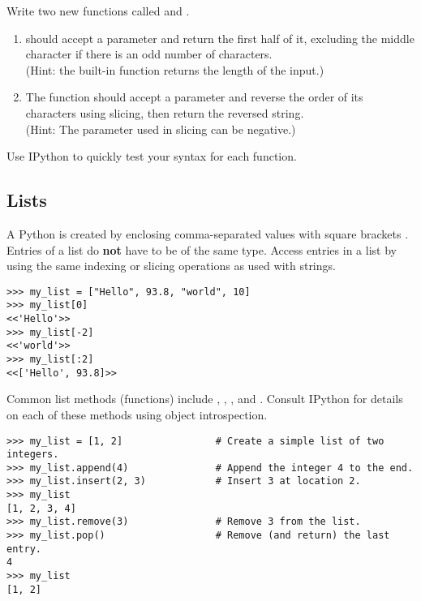 \begin{problem} %
Write two new functions called  and .
\begin{enumerate}
\item {} should accept a parameter and return the first half of it, excluding the middle character if there is an odd number of characters.
\\
(Hint: the built-in function  returns the length of the input.)
\item The  function should accept a parameter and reverse the order of its characters using slicing, then return the reversed string.
\\
(Hint: The  parameter used in slicing can be negative.)
\end{enumerate}
Use IPython to quickly test your syntax for each function.
\end{problem}

\subsection*{Lists} %

A Python  is created by enclosing comma-separated values with square brackets \li{[ ]}.
Entries of a list do \textbf{not} have to be of the same type.
Access entries in a list by using the same indexing or slicing operations as used with strings.

\begin{lstlisting}
>>> my_list = ["Hello", 93.8, "world", 10]
>>> my_list[0]
<<'Hello'>>
>>> my_list[-2]
<<'world'>>
>>> my_list[:2]
<<['Hello', 93.8]>>
\end{lstlisting}

Common list methods (functions) include , , , and .
Consult IPython for details on each of these methods using object introspection.
\begin{lstlisting}
>>> my_list = [1, 2]                # Create a simple list of two integers.
>>> my_list.append(4)               # Append the integer 4 to the end.
>>> my_list.insert(2, 3)            # Insert 3 at location 2.
>>> my_list
[1, 2, 3, 4]
>>> my_list.remove(3)               # Remove 3 from the list.
>>> my_list.pop()                   # Remove (and return) the last entry.
4
>>> my_list
[1, 2]
\end{lstlisting}


